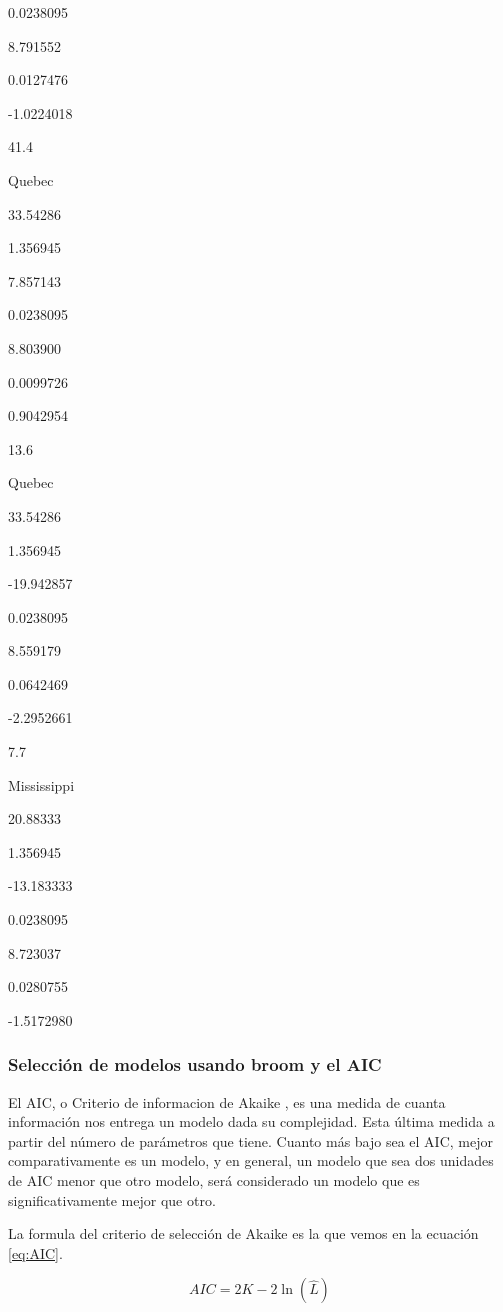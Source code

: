 \documentclass[]{book}
\begin{document}
0.0238095

8.791552

0.0127476

-1.0224018

41.4

Quebec

33.54286

1.356945

7.857143

0.0238095

8.803900

0.0099726

0.9042954

13.6

Quebec

33.54286

1.356945

-19.942857

0.0238095

8.559179

0.0642469

-2.2952661

7.7

Mississippi

20.88333

1.356945

-13.183333

0.0238095

8.723037

0.0280755

-1.5172980

\hypertarget{seleccion-de-modelos-usando-broom-y-el-aic}{%
\subsubsection{Selección de modelos usando broom y el
AIC}\label{seleccion-de-modelos-usando-broom-y-el-aic}}

El AIC, o Criterio de informacion de Akaike \citep{aho2014model}, es una
medida de cuanta información nos entrega un modelo dada su complejidad.
Esta última medida a partir del número de parámetros que tiene. Cuanto
más bajo sea el AIC, mejor comparativamente es un modelo, y en general,
un modelo que sea dos unidades de AIC menor que otro modelo, será
considerado un modelo que es significativamente mejor que otro.

La formula del criterio de selección de Akaike es la que vemos en la
ecuación \eqref{eq:AIC}.

\begin{equation} 
  AIC = 2 K - 2 \ln{(\hat{L})}
  \label{eq:AIC}
\end{equation}
\end{document}
